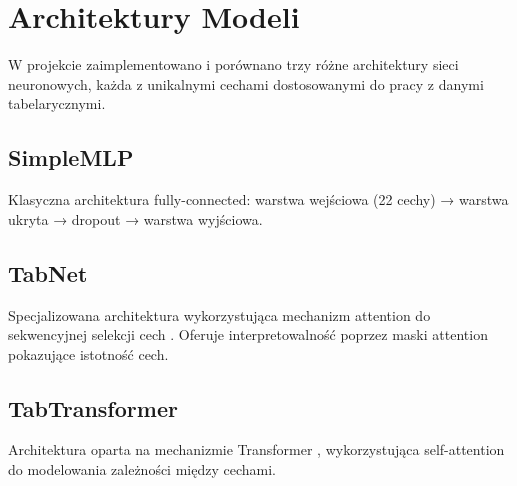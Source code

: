 \section{Architektury Modeli}
\label{sec:architectures}

W projekcie zaimplementowano i porównano trzy różne architektury sieci neuronowych, każda z unikalnymi cechami dostosowanymi do pracy z danymi tabelarycznymi.

\subsection{SimpleMLP}

Klasyczna architektura fully-connected: warstwa wejściowa (22 cechy) → warstwa ukryta → dropout → warstwa wyjściowa.



\subsection{TabNet}

Specjalizowana architektura wykorzystująca mechanizm attention do sekwencyjnej selekcji cech \cite{arik2019tabnet}. Oferuje interpretowalność poprzez maski attention pokazujące istotność cech.



\subsection{TabTransformer}

Architektura oparta na mechanizmie Transformer \cite{vaswani2017attention}, wykorzystująca self-attention do modelowania zależności między cechami.


